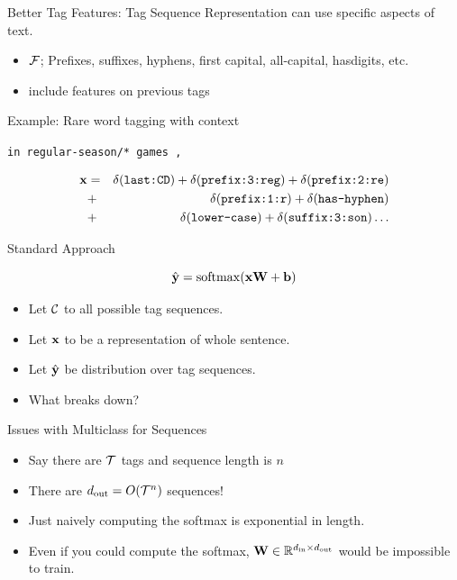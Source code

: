 \documentclass{beamer}
\begin{document}
\begin{frame}{Better Tag Features: Tag Sequence}
  Representation can use specific aspects of text.
  \begin{itemize}
  \item $\mathcal{F}$; Prefixes, suffixes, hyphens, first capital, all-capital, hasdigits, etc.
  \item {} include features on previous tags
  \end{itemize}

  Example: Rare word tagging with context

  \begin{center}
    \texttt{in  \alert{regular-season/*} games ,}
  \end{center}
  \begin{eqnarray*}
    \mathbf{x} &=& \delta(\texttt{last:CD}) + \delta(\texttt{prefix:3:reg}) + \delta(\texttt{prefix:2:re}) \\
    &+& \delta(\texttt{prefix:1:r}) + \delta(\texttt{has-hyphen}) \\
    &+& \delta(\texttt{lower-case}) + \delta(\texttt{suffix:3:son}) \ldots
  \end{eqnarray*}
\end{frame}



\begin{frame}{Standard Approach}
  
  
  \[ \hat{\boldy} = \softmax( \boldx \boldW + \boldb)  \] 
  \begin{itemize}
  \item Let $\mathcal{C}$ to all possible tag sequences.
    \air 
  \item Let $\mathbf{x}$ to be a representation of whole sentence.
    \air 
  \item Let $\hat{\mathbf{y}}$ be distribution over tag sequences.
    \air 

  \item What breaks down? 
  \end{itemize}
\end{frame}

\begin{frame}{Issues with Multiclass for Sequences }
  \begin{itemize}
  \item Say there are $\mathcal{T}$ tags and sequence length is $n$
    \air 

  \item There are ${d_{\mathrm{out}}} = O(\mathcal{T}^n)$ sequences! 
    \air 
  \item Just naively computing the softmax is exponential in length. 
    \air 

  \item Even if you could compute the softmax, $\mathbf{W} \in \mathbb{R}^{{d_{\mathrm{in}}} \times {d_{\mathrm{out}}}}$ would 
    be impossible to train.
  \end{itemize}
\end{frame}
\end{document}
